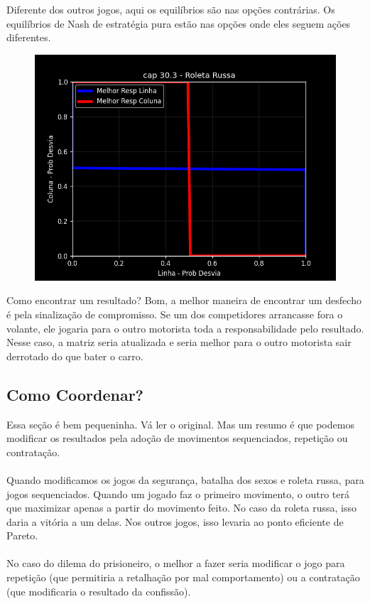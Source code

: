 \documentclass[a4paper,11pt,oneside]{book}
\theoremstyle{definition}
\theoremstyle{break}
\begin{document}
Diferente dos outros jogos, aqui os equilíbrios são nas opções contrárias. Os equilíbrios de Nash de estratégia pura estão nas opções onde eles seguem ações diferentes.

\begin{figure}[H]
\centering
\includegraphics[scale=0.75]{cap30_3-jogos_coordenacao_3.png}
\end{figure}

Como encontrar um resultado? Bom, a melhor maneira de encontrar um desfecho é pela sinalização de compromisso. Se um dos competidores arrancasse fora o volante, ele jogaria para o outro motorista toda a responsabilidade pelo resultado. Nesse caso, a matriz seria atualizada e seria melhor para o outro motorista sair derrotado do que bater o carro.

\subsection{Como Coordenar?}

Essa seção é bem pequeninha. Vá ler o original. Mas um resumo é que podemos modificar os resultados pela adoção de movimentos sequenciados, repetição ou contratação.
\\
\\
Quando modificamos os jogos da segurança, batalha dos sexos e roleta russa, para jogos sequenciados. Quando um jogado faz o primeiro movimento, o outro terá que maximizar apenas a partir do movimento feito. No caso da roleta russa, isso daria a vitória a um delas. Nos outros jogos, isso levaria ao ponto eficiente de Pareto.
\\
\\
No caso do dilema do prisioneiro, o melhor a fazer seria modificar o jogo para repetição (que permitiria a retalhação por mal comportamento) ou a contratação (que modificaria o resultado da confissão). 
\end{document}
